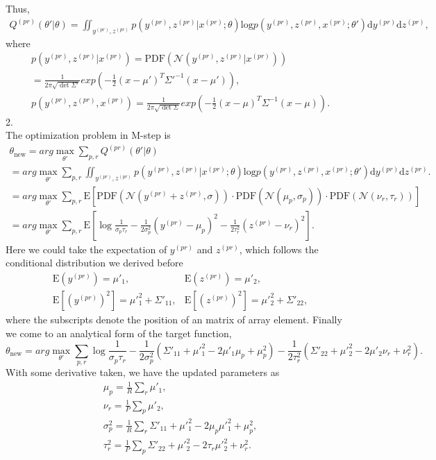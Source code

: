 \documentclass{article}
\newcommand{\dif}{\mathrm{d}}
\begin{document}
Thus,
\begin{gather*}
Q^{(pr)}(\theta'|\theta) = \iint_{y^{(pr)}, z^{(pr)}}p(y^{(pr)}, z^{(pr)}|x^{(pr)};\theta)\mathrm{log}p(y^{(pr)}, z^{(pr)}, x^{(pr)}; \theta')\dif y^{(pr)}\dif z^{(pr)},
\end{gather*}
where 
\begin{gather*}
p(y^{(pr)}, z^{(pr)}|x^{(pr)})=\mathrm{PDF}(\mathcal{N}(y^{(pr)}, z^{(pr)}|x^{(pr)}))\\
=\frac{1}{2\pi\sqrt{\det\Sigma'}}exp(-\frac{1}{2}(x-\mu')^T\Sigma'^{-1}(x-\mu')),\\
p(y^{(pr)}, z^{(pr)}, x^{(pr)})=\frac{1}{2\pi\sqrt{\det\Sigma}}exp(-\frac{1}{2}(x-\mu)^T\Sigma^{-1}(x-\mu)).
\end{gather*}
2.\\
The optimization problem in M-step is 
\begin{gather*}
\theta_\text{new} = arg\max_{\theta'}\sum_{p,r}Q^{(pr)}(\theta'|\theta)\\
=arg\max_{\theta'}\sum_{p,r}\iint_{y^{(pr)}, z^{(pr)}}p(y^{(pr)}, z^{(pr)}|x^{(pr)};\theta)\mathrm{log}p(y^{(pr)}, z^{(pr)}, x^{(pr)}; \theta')\dif y^{(pr)}\dif z^{(pr)}.	\\
=arg\max_{\theta'}\sum_{p,r}\mathrm{E}[\mathrm{PDF}(\mathcal{N}(y^{(pr)}+z^{(pr)},\sigma))\cdot\mathrm{PDF}(\mathcal{N}(\mu_p,\sigma_p))\cdot\mathrm{PDF}(\mathcal{N}(\nu_r,\tau_r))]\\
=arg\max_{\theta'}\sum_{p,r}\mathrm{E}[\log \frac{1}{\sigma_{p} \tau_{r}}-\frac{1}{2 \sigma_{p}^{2}}\left(y^{(p r)}-\mu_{p}\right)^{2}-\frac{1}{2 \tau_{r}^{2}}\left(z^{(p r)}-\nu_{r}\right)^{2}].
\end{gather*}
Here we could take the expectation of $y^{(pr)}$ and $z^{(pr)}$, which follows the conditional distribution we derived before
\begin{align*}
\mathrm{E}(y^{(pr)}) = \mu'_{1}, &\mathrm{E}(z^{(pr)}) = \mu'_{2},\\
\mathrm{E}[(y^{(pr)})^2] = \mu'^2_{1}+\Sigma'_{11}, &\mathrm{E}[(z^{(pr)})^2] = \mu'^2_{2}+\Sigma'_{22},
\end{align*}
where the subscripts denote the position of an matrix of array element. Finally we come to an analytical form of the target function,
\begin{equation*}
\theta_\text{new} = arg\max_{\theta'}\sum_{p,r}\log \frac{1}{\sigma_{p} \tau_{r}}-\frac{1}{2 \sigma_{p}^{2}}\left(\Sigma'_{11}+\mu'^{2}_1-2 \mu'_1 \mu_{p}+\mu_{p}^{2}\right)-\frac{1}{2 \tau_{r}^{2}}\left(\Sigma'_{22}+\mu'^{2}_2-2 \mu'_2 \nu_{r}+\nu_{r}^{2}\right).
\end{equation*}
With some derivative taken, we have the updated parameters as 
\begin{gather*}
\mu_p=\frac{1}{R}\sum_r\mu'_1,\\
\nu_r=\frac{1}{P}\sum_p\mu'_2,\\
\sigma^2_p=\frac{1}{R}\sum_r\Sigma'_{11}+\mu'^2_1-2\mu_p\mu'^2_1+\mu_p^2,\\
\tau^2_r=\frac{1}{P}\sum_p\Sigma'_{22}+\mu'^2_2-2\tau_r\mu'^2_2+\nu_r^2.
\end{gather*}
\end{document}

